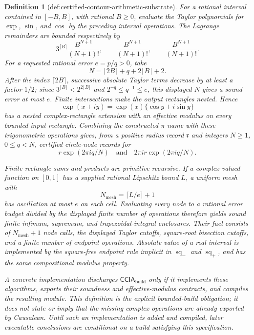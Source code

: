 \documentclass{article}
\newtheorem{definition}{Definition}
\begin{document}
\begin{definition}[def:certified-contour-arithmetic-substrate]
For a rational interval contained in \([-B,B]\), with rational \(B\ge0\), evaluate the Taylor polynomials for \(\exp\), \(\sin\), and \(\cos\) by the preceding interval operations.  The Lagrange remainders are bounded respectively by
\[
 3^{\lceil B\rceil}\frac{B^{N+1}}{(N+1)!},
 \qquad
 \frac{B^{N+1}}{(N+1)!},
 \qquad
 \frac{B^{N+1}}{(N+1)!}.
\]
For a requested rational error \(e=p/q>0\), take
\[
 N=\lceil2B\rceil+q+2\lceil B\rceil+2.
\]
After the index \(\lceil2B\rceil\), successive absolute Taylor terms decrease by at least a factor \(1/2\); since \(3^{\lceil B\rceil}<2^{2\lceil B\rceil}\) and \(2^{-q}\le q^{-1}\le e\), this displayed \(N\) gives a sound error at most \(e\).  Finite intersections make the output rectangles nested.  Hence
\[
 \exp(x+iy)=\exp(x)\{\cos y+i\sin y\}
\]
has a nested complex-rectangle extension with an effective modulus on every bounded input rectangle.  Combining the constructed \(\pi\) name with these trigonometric operations gives, from a positive radius record \(\mathfrak r\) and integers \(N\ge1\), \(0\le q<N\), certified circle-node records for
\[
 r\exp(2\pi iq/N)
 \quad\text{and}\quad
 2\pi i r\exp(2\pi iq/N).
\]

Finite rectangle sums and products are primitive recursive.  If a complex-valued function on \([0,1]\) has a supplied rational Lipschitz bound \(L\), a uniform mesh with
\[
 N_{\mathrm{mesh}}=\lceil L/e\rceil+1
\]
has oscillation at most \(e\) on each cell.  Evaluating every node to a rational error budget divided by the displayed finite number of operations therefore yields sound finite infimum, supremum, and trapezoidal-integral enclosures.  Their fuel consists of \(N_{\mathrm{mesh}}+1\) node calls, the displayed Taylor cutoffs, square-root bisection cutoffs, and a finite number of endpoint operations.  Absolute value of a real interval is implemented by the square-free endpoint rule implicit in \(\operatorname{sq}_{-}\) and \(\operatorname{sq}_{+}\), and has the same compositional modulus property.

A concrete implementation discharges \(\mathsf{CCIA}_{\mathrm{build}}\) only if it implements these algorithms, exports their soundness and effective-modulus contracts, and compiles the resulting module.  This definition is the explicit bounded-build obligation; it does not state or imply that the missing complex operations are already exported by Causalean.  Until such an implementation is added and compiled, later executable conclusions are conditional on a build satisfying this specification.
\end{definition}
\end{document}
